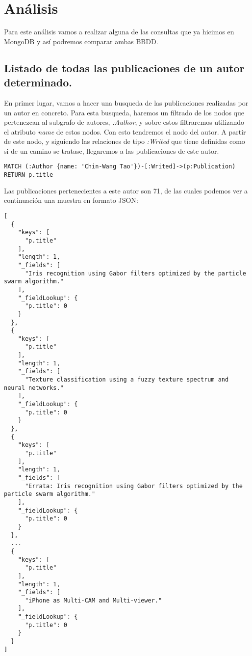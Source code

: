 \section{Análisis}

Para este análisis vamos a realizar alguna de las consultas que ya hicimos en MongoDB y así podremos comparar ambas \gls{BBDD}.

\subsection{Listado de todas las publicaciones de un autor determinado.}

En primer lugar, vamos a hacer una busqueda de las publicaciones realizadas por un autor en concreto. Para esta busqueda, haremos un filtrado de los nodos que pertenezcan al subgrafo de autores, \textit{:Author}, y sobre estos filtraremos utilizando el atributo \textit{name} de estos nodos. Con esto tendremos el nodo del autor. A partir de este nodo, y siguiendo las relaciones de tipo \textit{:Writed} que tiene definidas como si de un camino se tratase, llegaremos a las publicaciones de este autor.

\begin{verbatim}
MATCH (:Author {name: 'Chin-Wang Tao'})-[:Writed]->(p:Publication)
RETURN p.title
\end{verbatim}

Las publicaciones pertenecientes a este autor son 71, de las cuales podemos ver a continuación una muestra en formato \gls{JSON}:


\begin{verbatim}
[
  {
    "keys": [
      "p.title"
    ],
    "length": 1,
    "_fields": [
      "Iris recognition using Gabor filters optimized by the particle swarm algorithm."
    ],
    "_fieldLookup": {
      "p.title": 0
    }
  },
  {
    "keys": [
      "p.title"
    ],
    "length": 1,
    "_fields": [
      "Texture classification using a fuzzy texture spectrum and neural networks."
    ],
    "_fieldLookup": {
      "p.title": 0
    }
  },
  {
    "keys": [
      "p.title"
    ],
    "length": 1,
    "_fields": [
      "Errata: Iris recognition using Gabor filters optimized by the particle swarm algorithm."
    ],
    "_fieldLookup": {
      "p.title": 0
    }
  },
  ...
  {
    "keys": [
      "p.title"
    ],
    "length": 1,
    "_fields": [
      "iPhone as Multi-CAM and Multi-viewer."
    ],
    "_fieldLookup": {
      "p.title": 0
    }
  }
]
\end{verbatim}


